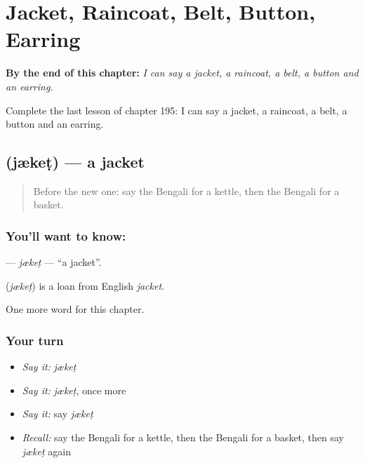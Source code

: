
\chapter{Jacket, Raincoat, Belt, Button, Earring}
\label{ch:bn-jacket-raincoat-belt-button-earring}

\begin{chapteropening}
\textbf{By the end of this chapter:} \emph{I can say a jacket, a raincoat, a belt, a button and an earring.}

Complete the last lesson of chapter 195: I can say a jacket, a raincoat, a belt, a button and an earring.
\end{chapteropening}

\section[\texorpdfstring{\bn{জ্যাকেট} (jækeṭ)}{জ্যাকেট (jækeṭ)}]{ (jækeṭ) — a jacket}

\label{lesson:BN-C195-jket}



\begin{quote}
Before the new one: say the Bengali for a kettle, then the Bengali for a basket.
\end{quote}

\subsection*{You'll want to know: }
\textbf{} — \emph{jækeṭ} — \textquotedblleft{}a jacket\textquotedblright{}.

\begin{cousinweb}
\textbf{} (\emph{jækeṭ}) is a loan from English \emph{jacket}.
\end{cousinweb}

\begin{grammarlens}[title={What you've built}]
One more word for this chapter.
\end{grammarlens}

\subsection*{Your turn}
\begin{itemize}
\raggedright
  \item \emph{Say it:} \emph{jækeṭ}
  \item \emph{Say it:} \emph{jækeṭ}, once more
  \item \emph{Say it:} say \emph{jækeṭ}
  \item \emph{Recall:} say the Bengali for a kettle, then the Bengali for a basket, then say \emph{jækeṭ} again
\end{itemize}

